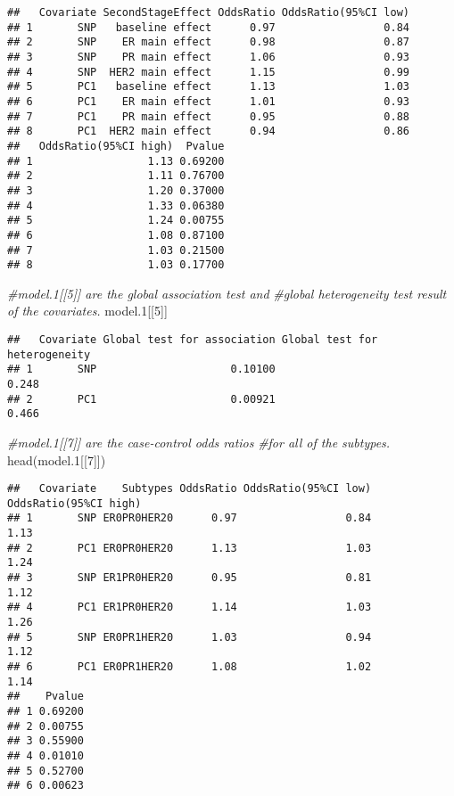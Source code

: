 \documentclass[11pt,]{article}
\newenvironment{Shaded}{\begin{snugshade}}{\end{snugshade}}
\newcommand{\CommentTok}[1]{\textcolor[rgb]{0.56,0.35,0.01}{\textit{#1}}}
\newcommand{\DecValTok}[1]{\textcolor[rgb]{0.00,0.00,0.81}{#1}}
\newcommand{\FloatTok}[1]{\textcolor[rgb]{0.00,0.00,0.81}{#1}}
\newcommand{\FunctionTok}[1]{\textcolor[rgb]{0.00,0.00,0.00}{#1}}
\newcommand{\NormalTok}[1]{#1}
\begin{document}
\begin{verbatim}
##   Covariate SecondStageEffect OddsRatio OddsRatio(95%CI low)
## 1       SNP   baseline effect      0.97                 0.84
## 2       SNP    ER main effect      0.98                 0.87
## 3       SNP    PR main effect      1.06                 0.93
## 4       SNP  HER2 main effect      1.15                 0.99
## 5       PC1   baseline effect      1.13                 1.03
## 6       PC1    ER main effect      1.01                 0.93
## 7       PC1    PR main effect      0.95                 0.88
## 8       PC1  HER2 main effect      0.94                 0.86
##   OddsRatio(95%CI high)  Pvalue
## 1                  1.13 0.69200
## 2                  1.11 0.76700
## 3                  1.20 0.37000
## 4                  1.33 0.06380
## 5                  1.24 0.00755
## 6                  1.08 0.87100
## 7                  1.03 0.21500
## 8                  1.03 0.17700
\end{verbatim}

\begin{Shaded}
\begin{Highlighting}[]
\CommentTok{\#model.1[[5]] are the global association test and }
\CommentTok{\#global heterogeneity test result of the covariates.}
\NormalTok{model}\FloatTok{.1}\NormalTok{[[}\DecValTok{5}\NormalTok{]]}
\end{Highlighting}
\end{Shaded}

\begin{verbatim}
##   Covariate Global test for association Global test for heterogeneity
## 1       SNP                     0.10100                         0.248
## 2       PC1                     0.00921                         0.466
\end{verbatim}

\begin{Shaded}
\begin{Highlighting}[]
\CommentTok{\#model.1[[7]] are the case{-}control odds ratios }
\CommentTok{\#for all of the subtypes.}
\FunctionTok{head}\NormalTok{(model}\FloatTok{.1}\NormalTok{[[}\DecValTok{7}\NormalTok{]])}
\end{Highlighting}
\end{Shaded}

\begin{verbatim}
##   Covariate    Subtypes OddsRatio OddsRatio(95%CI low) OddsRatio(95%CI high)
## 1       SNP ER0PR0HER20      0.97                 0.84                  1.13
## 2       PC1 ER0PR0HER20      1.13                 1.03                  1.24
## 3       SNP ER1PR0HER20      0.95                 0.81                  1.12
## 4       PC1 ER1PR0HER20      1.14                 1.03                  1.26
## 5       SNP ER0PR1HER20      1.03                 0.94                  1.12
## 6       PC1 ER0PR1HER20      1.08                 1.02                  1.14
##    Pvalue
## 1 0.69200
## 2 0.00755
## 3 0.55900
## 4 0.01010
## 5 0.52700
## 6 0.00623
\end{verbatim}
\end{document}

